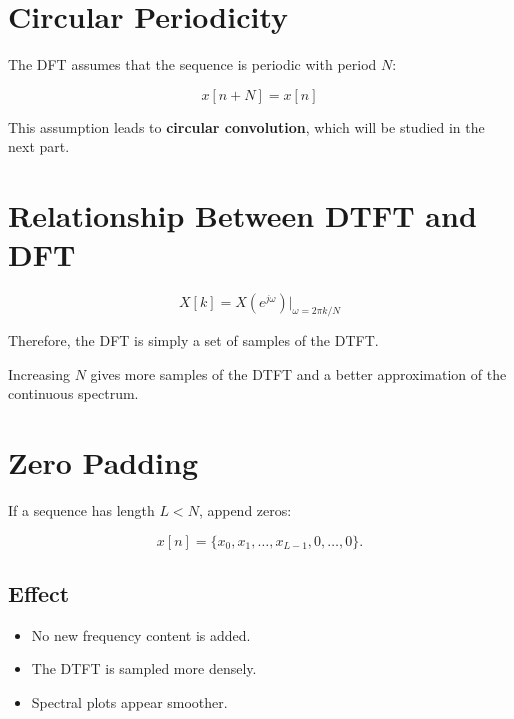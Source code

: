 \section{Circular Periodicity}

The DFT assumes that the sequence is periodic with period \(N\):

\[
\boxed{
x[n+N]=x[n]
}
\]

This assumption leads to \textbf{circular convolution}, which will be studied in
the next part.


\section{Relationship Between DTFT and DFT}

\[
\boxed{
X[k]=X(e^{j\omega})\Big|_{\omega=2\pi k/N}
}
\]

Therefore, the DFT is simply a set of samples of the DTFT.

Increasing \(N\) gives more samples of the DTFT and a better approximation of the
continuous spectrum.


\section{Zero Padding}

If a sequence has length \(L < N\), append zeros:

\[
x[n]=\{x_0,x_1,\ldots,x_{L-1},0,\ldots,0\}.
\]


\subsection{Effect}

\begin{itemize}
\item No new frequency content is added.
\item The DTFT is sampled more densely.
\item Spectral plots appear smoother.
\end{itemize}


